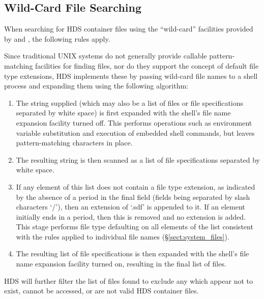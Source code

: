 \documentclass[twoside,11pt]{starlink}
\providecommand{\qt}[1]{``#1''}
\begin{document}
\subsection{\label{sect:system_wild}Wild-Card File Searching}

When searching for HDS container files using the \qt{wild-card}
facilities provided by  and
, the following rules apply.

Since traditional UNIX systems do not generally provide callable
pattern-matching facilities for finding files, nor do they support the
concept of default file type extensions, HDS implements these by
passing wild-card file names to a shell process and expanding them
using the following algorithm:

\begin{enumerate}

\item
The string supplied (which may also be a list of files or file
specifications separated by white space) is first expanded with the
shell's file name expansion facility turned off. This performs
operations such as environment variable substitution and execution of
embedded shell commands, but leaves pattern-matching characters in
place.

\item
The resulting string is then scanned as a list of file specifications
separated by white space.

\item
If any element of this list does not contain a file type extension, as
indicated by the absence of a period in the final field (fields being
separated by slash characters `/'), then an extension of `.sdf' is
appended to it. If an element initially ends in a period, then this is
removed and no extension is added. This stage performs file type
defaulting on all elements of the list consistent with the rules
applied to individual file names (\S\ref{sect:system_files}).

\item
The resulting list of file specifications is then expanded with the
shell's file name expansion facility turned on, resulting in the final
list of files.

\end{enumerate}

HDS will further filter the list of files found to exclude any which
appear not to exist, cannot be accessed, or are not valid HDS
container files.
\end{document}
